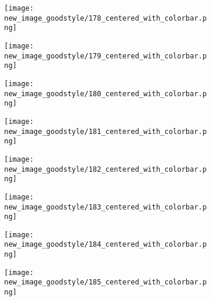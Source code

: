 \documentclass[a4paper,12pt]{article}
\begin{document}
\begin{figure}[H]
  \begin{subfigure}{0.11\textwidth}
    \texttt{[image: new\_image\_goodstyle/178\_centered\_with\_colorbar.png]}
  \end{subfigure}
  \hfill
  \begin{subfigure}{0.11\textwidth}
    \texttt{[image: new\_image\_goodstyle/179\_centered\_with\_colorbar.png]}
  \end{subfigure}
  \hfill
  \begin{subfigure}{0.11\textwidth}
    \texttt{[image: new\_image\_goodstyle/180\_centered\_with\_colorbar.png]}
  \end{subfigure}
  \hfill
  \begin{subfigure}{0.11\textwidth}
    \texttt{[image: new\_image\_goodstyle/181\_centered\_with\_colorbar.png]}
  \end{subfigure}
  \hfill
  \begin{subfigure}{0.11\textwidth}
    \texttt{[image: new\_image\_goodstyle/182\_centered\_with\_colorbar.png]}
  \end{subfigure}
  \hfill
  \begin{subfigure}{0.11\textwidth}
    \texttt{[image: new\_image\_goodstyle/183\_centered\_with\_colorbar.png]}
  \end{subfigure}
  \hfill
  \begin{subfigure}{0.11\textwidth}
    \texttt{[image: new\_image\_goodstyle/184\_centered\_with\_colorbar.png]}
  \end{subfigure}
  \hfill
  \begin{subfigure}{0.11\textwidth}
    \texttt{[image: new\_image\_goodstyle/185\_centered\_with\_colorbar.png]}
  \end{subfigure}
  \hfill
\end{figure}
\end{document}
